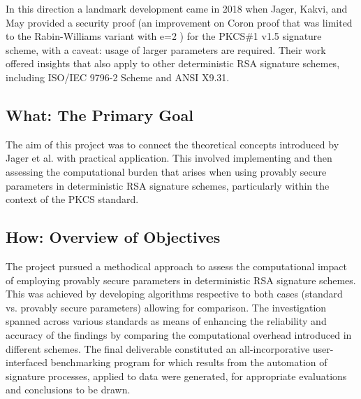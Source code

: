 \documentclass[]{final_report}
\theoremstyle{definition}
\begin{document}
In this direction a landmark development came in 2018 when Jager, Kakvi, and May \cite{jager2018security} provided a security proof (an improvement on Coron proof that was limited to the Rabin-Williams variant with e=2 \cite{coron2002security}) for the PKCS\#1 v1.5 signature scheme, with a caveat: usage of larger parameters are required. Their work offered insights that also apply to other deterministic RSA signature schemes, including ISO/IEC 9796-2 Scheme and ANSI X9.31.

\subsection{What: The Primary Goal}
The aim of this project was to connect the theoretical concepts introduced by Jager et al. \cite{jager2018security} with practical application. This involved implementing and then assessing the computational burden that arises when using provably secure parameters in deterministic RSA signature schemes, particularly within the context of the PKCS standard.

\subsection{How: Overview of Objectives}
The project pursued a methodical approach to assess the computational impact of employing provably secure parameters in deterministic RSA signature schemes. This was achieved by developing algorithms respective to both cases (standard vs. provably secure parameters) allowing for comparison. The investigation spanned across various standards as means of enhancing the reliability and accuracy of the findings by comparing the computational overhead introduced in different schemes. The final deliverable constituted an all-incorporative user-interfaced benchmarking program for which results from the automation of signature processes, applied to data were generated, for appropriate evaluations and conclusions to be drawn.
\end{document}

